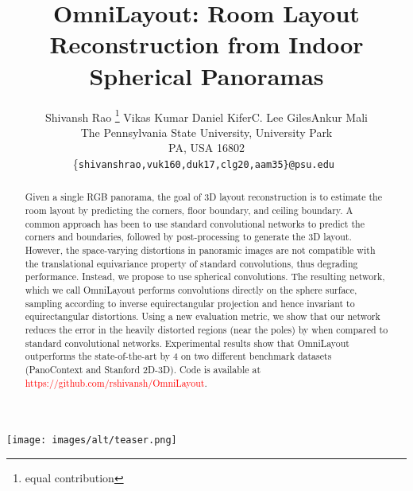 \documentclass[final]{cvpr}
\begin{document}
\title{OmniLayout: Room Layout Reconstruction from Indoor Spherical Panoramas}



\author{Shivansh Rao \thanks{equal contribution} \qquad Vikas Kumar \footnotemark[1] \qquad Daniel Kifer\qquad C. Lee Giles\qquad Ankur Mali\\The Pennsylvania State University, University Park\\
PA, USA 16802\\
\{\tt\small shivanshrao,vuk160,duk17,clg20,aam35\}@psu.edu
}

\maketitle

\begin{strip}\centering
\texttt{[image: images/alt/teaser.png]}
\end{strip}

\begin{abstract}
 
Given a single RGB panorama, the goal of 3D layout reconstruction is to estimate the room layout by predicting the corners, floor boundary, and ceiling boundary. A common approach has been to use standard convolutional networks to predict the corners and boundaries, followed by post-processing to generate the 3D layout. However, the space-varying distortions in panoramic images are not compatible with the translational equivariance property of standard convolutions, thus degrading performance. Instead, we propose to use spherical convolutions. The resulting network, which we call OmniLayout performs convolutions directly on the sphere surface, sampling according to inverse equirectangular projection and hence invariant to equirectangular distortions. Using a new evaluation metric, we show that our network reduces the error in the heavily distorted regions (near the poles) by  when compared to standard convolutional networks. Experimental results show that OmniLayout outperforms the state-of-the-art by 4 on two different benchmark datasets (PanoContext and Stanford 2D-3D). Code is available at \textcolor{red}{ https://github.com/rshivansh/OmniLayout}.
\end{abstract}
\end{document}
